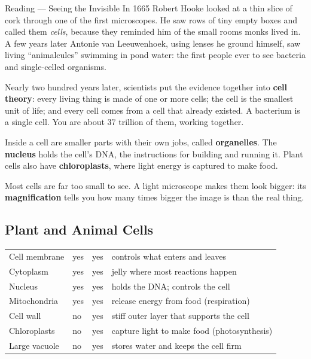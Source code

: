\begin{readingbox}{Reading --- Seeing the Invisible}
In 1665 Robert Hooke looked at a thin slice of cork through one of the first microscopes. He saw rows of tiny empty boxes and called them \emph{cells}, because they reminded him of the small rooms monks lived in. A few years later Antonie van Leeuwenhoek, using lenses he ground himself, saw living ``animalcules'' swimming in pond water: the first people ever to see bacteria and single-celled organisms.

Nearly two hundred years later, scientists put the evidence together into \textbf{cell theory}: every living thing is made of one or more cells; the cell is the smallest unit of life; and every cell comes from a cell that already existed. A bacterium is a single cell. You are about 37 trillion of them, working together.

Inside a cell are smaller parts with their own jobs, called \textbf{organelles}. The \textbf{nucleus} holds the cell's DNA, the instructions for building and running it. Plant cells also have \textbf{chloroplasts}, where light energy is captured to make food.

Most cells are far too small to see. A light microscope makes them look bigger: its \textbf{magnification} tells you how many times bigger the image is than the real thing.
\end{readingbox}

\rcreset
{}

\label{theory:1}

\subsection{Plant and Animal Cells}\label{sub:a1.1}

\begin{ctab}
\begin{tabular}{|C{3.0cm}|C{1.5cm}|C{1.5cm}|W{4.0cm}|}
  \hline{} &  &  &  \\ \hline
  Cell membrane & yes & yes & controls what enters and leaves \\ \hline
  Cytoplasm & yes & yes & jelly where most reactions happen \\ \hline
  Nucleus & yes & yes & holds the DNA; controls the cell \\ \hline
  Mitochondria & yes & yes & release energy from food (respiration) \\ \hline
  Cell wall & no & yes & stiff outer layer that supports the cell \\ \hline
  Chloroplasts & no & yes & capture light to make food (photosynthesis) \\ \hline
  Large vacuole & no & yes & stores water and keeps the cell firm \\ \hline
\end{tabular}
\end{ctab}

